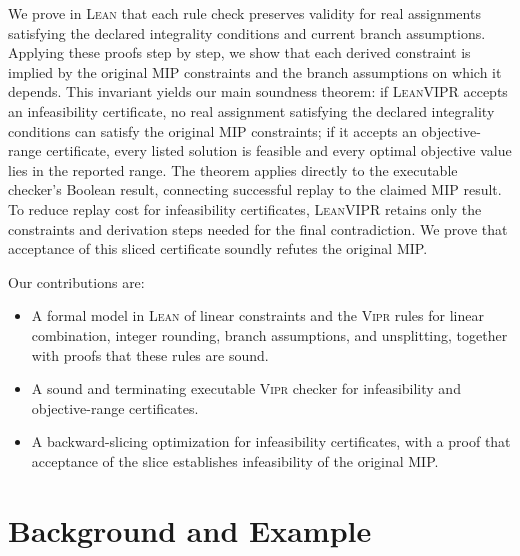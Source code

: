 \documentclass{article}
\newcommand{\tool}{\textsc{LeanVIPR}}
\newcommand{\scip}{\textsc{Scip}}
\newcommand{\vipr}{\textsc{Vipr}}
\newcommand{\lean}{\textsc{Lean}}
\begin{document}
We prove in \lean{} that each rule check preserves validity for real assignments satisfying the declared integrality conditions and current branch assumptions.
Applying these proofs step by step, we show that each derived constraint is implied by the original MIP constraints and the branch assumptions on which it depends.
This invariant yields our main soundness theorem: if \tool{} accepts an infeasibility certificate, no real assignment satisfying the declared integrality conditions can satisfy the original MIP constraints; if it accepts an objective-range certificate, every listed solution is feasible and every optimal objective value lies in the reported range.
The theorem applies directly to the executable checker's Boolean result, connecting successful replay to the claimed MIP result.
To reduce replay cost for infeasibility certificates, \tool{} retains only the constraints and derivation steps needed for the final contradiction.
We prove that acceptance of this sliced certificate soundly refutes the original MIP.

Our contributions are:
\begin{itemize}
\item A formal model in \lean{} of linear constraints and the \vipr{} rules for linear combination, integer rounding, branch assumptions, and unsplitting, together with proofs that these rules are sound.
\item A sound and terminating executable \vipr{} checker for infeasibility and objective-range certificates.
\item A backward-slicing optimization for infeasibility certificates, with a proof that acceptance of the slice establishes infeasibility of the original MIP.
\end{itemize}

\section{Background and Example}\label{sec:background}

\end{document}
